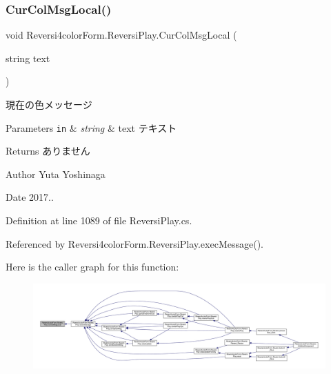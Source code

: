 \subsubsection{\texorpdfstring{Cur\+Col\+Msg\+Local()}{CurColMsgLocal()}}
{\footnotesize\ttfamily void Reversi4color\+Form.\+Reversi\+Play.\+Cur\+Col\+Msg\+Local (\begin{DoxyParamCaption}\item[{string}]{text }\end{DoxyParamCaption})\hspace{0.3cm}{\ttfamily [private]}}



現在の色メッセージ 


\begin{DoxyParams}[1]{Parameters}
\mbox{\tt in}  & {\em string} & text テキスト \\
\hline
\end{DoxyParams}
\begin{DoxyReturn}{Returns}
ありません 
\end{DoxyReturn}
\begin{DoxyAuthor}{Author}
Yuta Yoshinaga 
\end{DoxyAuthor}
\begin{DoxyDate}{Date}
2017.. 
\end{DoxyDate}


Definition at line 1089 of file Reversi\+Play.\+cs.



Referenced by Reversi4color\+Form.\+Reversi\+Play.\+exec\+Message().

Here is the caller graph for this function\+:
\nopagebreak
\begin{figure}[H]
\begin{center}
\leavevmode
\includegraphics[width=350pt]{class_reversi4color_form_1_1_reversi_play_ad1e6152fe3e0730872789f838cef8aad_icgraph}
\end{center}
\end{figure}
\mbox{\label{class_reversi4color_form_1_1_reversi_play_ada1cd7e7bcfaadc34f40a59aee12aa50}} 

